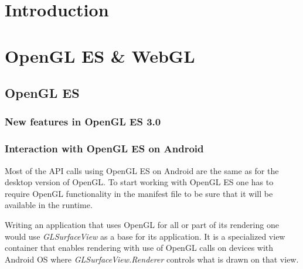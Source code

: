\documentclass[a4paper,11pt]{article}
\renewenvironment{abstract}
{\itshape \small
  \begin{center}
  \bfseries \abstractname\vspace{-.5em}\vspace{0pt}
  \end{center}
  \list{}{
    \setlength{\leftmargin}{1.5cm}%
    \setlength{\rightmargin}{\leftmargin}%
  }%
  \item\relax}
{\endlist}
\begin{document}
\begin{abstract}
\label{Abstract}

\pagebreak




\section{Introduction} 



\pagebreak[3]
\section{OpenGL ES \& WebGL}


\pagebreak[3] 
\subsection{OpenGL ES}

\subsubsection{New features in OpenGL ES 3.0}


\subsubsection{Interaction with OpenGL ES on Android}
Most of the API calls using OpenGL ES on Android are the same as for the desktop version of OpenGL. 
To start working with OpenGL ES one has to require OpenGL functionality in the manifest file to be sure that it will be available in the runtime.



Writing an application that uses OpenGL for all or part of its rendering one would use \emph{GLSurfaceView} \cite{android_glsurfaceview} as a base for its application.
It is a specialized view container that enables rendering with use of OpenGL calls on devices with Android OS where \emph{GLSurfaceView.Renderer} controls what is drawn on that view.


\end{abstract}
\end{document}

